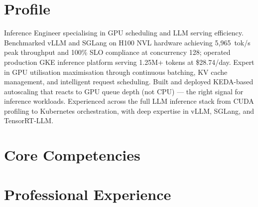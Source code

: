 \documentclass[11pt,a4paper]{moderncv}
\begin{document}
\makecvtitle

\section{Profile}
Inference Engineer specialising in GPU scheduling and LLM serving efficiency. Benchmarked vLLM and SGLang on H100 NVL hardware achieving 5,965~tok/s peak throughput and 100\% SLO compliance at concurrency 128; operated production GKE inference platform serving 1.25M+ tokens at \$28.74/day. Expert in GPU utilisation maximisation through continuous batching, KV cache management, and intelligent request scheduling. Built and deployed KEDA-based autoscaling that reacts to GPU queue depth (not CPU) — the right signal for inference workloads. Experienced across the full LLM inference stack from CUDA profiling to Kubernetes orchestration, with deep expertise in vLLM, SGLang, and TensorRT-LLM.

\section{Core Competencies}

\section{Professional Experience}
\end{document}
